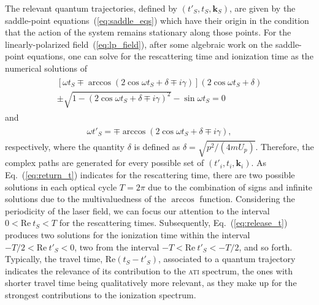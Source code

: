 The relevant quantum trajectories, defined by $(t'_{S}, t_{S},
\mathbf{k}_{S})$, are given by the saddle-point
equations~(\ref{eq:saddle_eqs}) which have their origin in the
condition that the action of the system remains stationary along those
points. For the linearly-polarized field~(\ref{eq:lp_field}), after
some algebraic work on the saddle-point equations, one can solve for
the rescattering time and ionization time as the numerical solutions
of~\cite{KopoldOptComm2000}
%
\begin{eqnarray}
  \label{eq:return_t}
  \begin{split}
    [\omega t_{S} \mp \arccos(2\cos\omega t_{S} + \delta \mp i\gamma)]
    (2\cos\omega t_{S} + \delta) \\
    \pm \sqrt{1 - (2\cos\omega t_{S} + \delta \mp i\gamma)^{2}} 
    - \sin\omega t_{S} = 0
  \end{split}
\end{eqnarray}
%
and
%
\begin{eqnarray}
  \label{eq:release_t}
  \begin{split}
    \omega t'_{S} = \mp \arccos(2\cos\omega t_{S} + \delta \mp i\gamma),
  \end{split}
\end{eqnarray}  
%
respectively, where the quantity $\delta$ is defined as $\delta =
\sqrt{p^{2} / (4mU_{p})}$. Therefore, the complex paths are generated
for every possible set of $(t'_{i}, t_{i}, \mathbf{k}_{i})$. As
Eq.~(\ref{eq:return_t}) indicates for the rescattering time, there are
two possible solutions in each optical cycle $T = 2\pi$ due to the
combination of signs and infinite solutions due to the multivaluedness
of the $\arccos$ function. Considering the periodicity of the laser
field, we can focus our attention to the interval $0 <
\mathrm{Re}\ t_{S} < T$ for the rescattering times. Subsequently,
Eq.~(\ref{eq:release_t}) produces two solutions for the ionization
time within the interval $-T/2 < \mathrm{Re}\ t'_{S} < 0$, two from
the interval $-T < \mathrm{Re}\ t'_{S} < -T/2$, and so
forth. Typically, the travel time, $\mathrm{Re}(t_{S} - t'_{S})$,
associated to a quantum trajectory indicates the relevance of its
contribution to the \textsc{ati} spectrum, the ones with shorter
travel time being qualitatively more relevant, as they make up for the
strongest contributions to the ionization spectrum.

